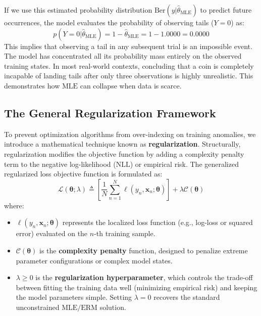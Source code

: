 \documentclass{article}
\begin{document}
If we use this estimated probability distribution $\text{Ber}(y | \hat{\theta}_{\text{MLE}})$ to predict future occurrences, the model evaluates the probability of observing tails ($Y = 0$) as:
\begin{equation}
p(Y = 0 | \hat{\theta}_{\text{MLE}}) = 1 - \hat{\theta}_{\text{MLE}} = 1 - 1.0000 = \mathbf{0.0000}
\end{equation}
This implies that observing a tail in any subsequent trial is an impossible event. The model has concentrated all its probability mass entirely on the observed training states. In most real-world contexts, concluding that a coin is completely incapable of landing tails after only three observations is highly unrealistic. This demonstrates how $\text{MLE}$ can collapse when data is scarce.



\subsection{The General Regularization Framework}

To prevent optimization algorithms from over-indexing on training anomalies, we introduce a mathematical technique known as \textbf{regularization}. Structurally, regularization modifies the objective function by adding a complexity penalty term to the negative log-likelihood ($\text{NLL}$) or empirical risk. The generalized regularized loss objective function is formulated as:
\begin{equation}
\mathcal{L}(\boldsymbol{\theta}; \lambda) \triangleq \left[ \frac{1}{N} \sum_{n=1}^N \ell(y_n, \mathbf{x}_n; \boldsymbol{\theta}) \right] + \lambda \mathcal{C}(\boldsymbol{\theta})
\end{equation}
where:
\begin{itemize}
    \item $\ell(y_n, \mathbf{x}_n; \boldsymbol{\theta})$ represents the localized loss function (e.g., log-loss or squared error) evaluated on the $n$-th training sample.
    \item $\mathcal{C}(\boldsymbol{\theta})$ is the \textbf{complexity penalty} function, designed to penalize extreme parameter configurations or complex model states.
    \item $\lambda \ge 0$ is the \textbf{regularization hyperparameter}, which controls the trade-off between fitting the training data well (minimizing empirical risk) and keeping the model parameters simple. Setting $\lambda = 0$ recovers the standard unconstrained $\text{MLE}/\text{ERM}$ solution.
\end{itemize}
\end{document}
